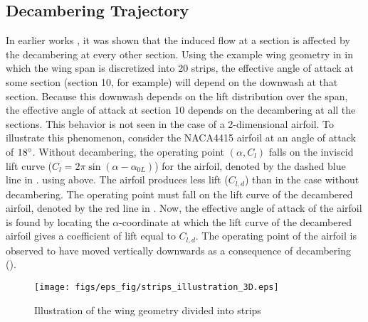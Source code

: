 \subsection{Decambering Trajectory}
In earlier works \cite{Mukherjee_poststall_2006,Paul_Gopa_Iteration_Schemes}, it was shown that the induced flow at a section is affected by the decambering at every other section.
Using the example wing geometry in  in which the wing span is discretized into 20 strips, the effective angle of attack at some section (section 10, for example) will depend on the downwash at that section. Because this downwash depends on the lift distribution over the span, the effective angle of attack at section 10 depends on the decambering at all the sections. %
This behavior is not seen in the case of a 2-dimensional airfoil.
To illustrate this phenomenon, consider the  NACA4415 airfoil at an angle of attack of $18^\circ{}$.
Without decambering, the operating point $(\alpha, C_l)$ falls on the inviscid lift curve ($C_l = 2\pi \sin(\alpha - \alpha_{0L})$) for the airfoil, denoted by the dashed blue line in .
 using  above. The airfoil produces less lift ($C_{l,d}$) than in the case without decambering.
The operating point must fall on the lift curve of the decambered airfoil, denoted by the red line in .
Now, the effective angle of attack of the airfoil is found by locating the $\alpha$-coordinate at which the lift curve of the decambered airfoil gives a coefficient of lift equal to $C_{l,d}$.
The operating point of the airfoil is observed to have moved vertically downwards as a consequence of decambering ().

\begin{figure}
    \centering
    \texttt{[image: figs/eps\_fig/strips\_illustration\_3D.eps]}
    \caption{Illustration of the wing geometry divided into strips}
    \label{fig:strips-illustration-3D}
\end{figure}

